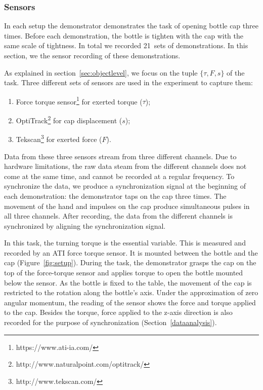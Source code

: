 \subsubsection{Sensors}
\label{sec:sensor}
In each setup the demonstrator demonstrates the task of opening bottle
cap three times. Before each demonstration, the bottle is tighten with
the cap with the same scale of tightness. In total we recorded 21~sets
of demonstrations. In this section, we the sensor recording of these
demonstrations.


As explained in section~\ref{sec:objectlevel}, we focus on the tuple
$\{\tau,F,s\}$ of the task. Three different sets of sensors are used in
the experiment to capture them:

\begin{enumerate}
\item Force torque sensor\footnote{https://www.ati-ia.com/} for exerted torque ($\tau$);
\item OptiTrack\footnote{http://www.naturalpoint.com/optitrack/} for cap displacement ($s$);
\item Tekscan\footnote{http://www.tekscan.com/} for exerted force ($F$).
\end{enumerate}

Data from these three sensors stream from three different
channels. Due to hardware limitations, the raw data steam from the
different channels does not come at the same time, and cannot be
recorded at a regular frequency. To synchronize the data, we produce a
synchronization signal at the beginning of each demonstration: the
demonstrator taps on the cap three times. The movement of the hand and
impulses on the cap produce simultaneous pulses in all three
channels. After recording, the data from the different channels is
synchronized by aligning the synchronization signal.


In this task, the turning torque is the essential variable. This is
measured and recorded by an ATI force torque sensor. It is mounted
between the bottle and the cap (Figure~\ref{fig:setup}). During the
task, the demonstrator grasps the cap on the top of the force-torque
sensor and applies torque to open the bottle mounted below the
sensor. As the bottle is fixed to the table, the movement of the cap
is restricted to the rotation along the bottle's axis. Under the
approximation of zero angular momentum, the reading of the sensor
shows the force and torque applied to the cap. Besides the torque,
force applied to the z-axis direction is also recorded for the purpose
of synchronization (Section~\ref{dataanalysis}).

